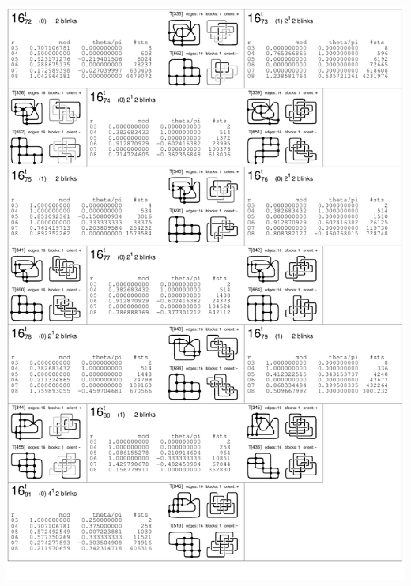 \begin{center}
 \includegraphics[height=23.5cm]{E.figsbw2/con3catalog022_bw.pdf} \eject

\end{center}
